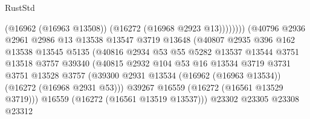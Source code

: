 \begin{lexlean}{RustStd}
\begin{coremodule}
                                              (@16962 (@16963 @13508))
                                              (@16272 (@16968 @2923 @13))))))))
                                  (@40796
                                    @2936
                                    @2961
                                    @2986
                                    @13
                                    @13538
                                    @13547
                                    @3719
                                    @13648
                                    (@40807
                                      @2935
                                      @396
                                      @162
                                      @13538
                                      @13545
                                      @5135
                                      (@40816
                                        @2934
                                        @53
                                        @55
                                        @5282
                                        @13537
                                        @13544
                                        @3751
                                        @13518
                                        @3757
                                        @39340
                                        (@40815
                                          @2932
                                          @104
                                          @53
                                          @16
                                          @13534
                                          @3719
                                          @3731
                                          @3751
                                          @13528
                                          @3757
                                          (@39300
                                            @2931
                                            @13534
                                            (@16962 (@16963 @13534))
                                            (@16272 (@16968 @2931 @53)))
                                          @39267
                                          @16559
                                          (@16272 (@16561 @13529 @3719)))
                                        @16559
                                        (@16272 (@16561 @13519 @13537)))
                                      @23302
                                      @23305
                                      @23308
                                      @23312

\end{coremodule}
\end{lexlean}

